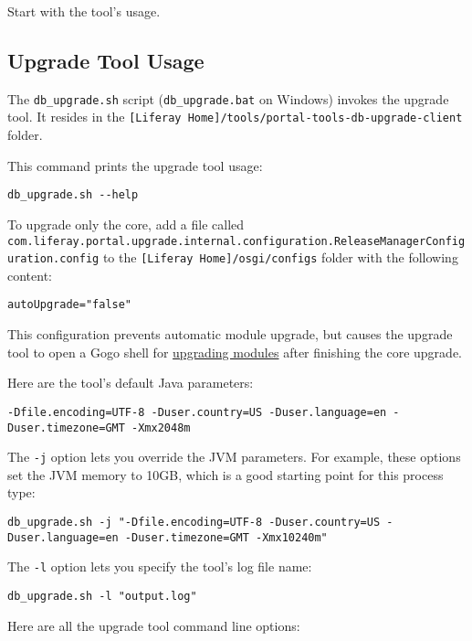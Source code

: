 Start with the tool's usage.

\subsection{Upgrade Tool Usage}\label{upgrade-tool-usage}

The \texttt{db\_upgrade.sh} script (\texttt{db\_upgrade.bat} on Windows)
invokes the upgrade tool. It resides in the
\texttt{{[}Liferay\ Home{]}/tools/portal-tools-db-upgrade-client}
folder.

This command prints the upgrade tool usage:

\begin{verbatim}
db_upgrade.sh --help
\end{verbatim}

To upgrade only the core, add a file called
\texttt{com.liferay.portal.upgrade.internal.configuration.ReleaseManagerConfiguration.config}
to the \texttt{{[}Liferay\ Home{]}/osgi/configs} folder with the
following content:

\begin{verbatim}
autoUpgrade="false"
\end{verbatim}

This configuration prevents automatic module upgrade, but causes the
upgrade tool to open a Gogo shell for
\hyperref[gogo-shell-commands-for-module-upgrades]{upgrading modules}
after finishing the core upgrade.

Here are the tool's default Java parameters:

\begin{verbatim}
-Dfile.encoding=UTF-8 -Duser.country=US -Duser.language=en -Duser.timezone=GMT -Xmx2048m
\end{verbatim}

The \texttt{-j} option lets you override the JVM parameters. For
example, these options set the JVM memory to 10GB, which is a good
starting point for this process type:

\begin{verbatim}
db_upgrade.sh -j "-Dfile.encoding=UTF-8 -Duser.country=US -Duser.language=en -Duser.timezone=GMT -Xmx10240m"
\end{verbatim}

The \texttt{-l} option lets you specify the tool's log file name:

\begin{verbatim}
db_upgrade.sh -l "output.log"
\end{verbatim}

Here are all the upgrade tool command line options:

